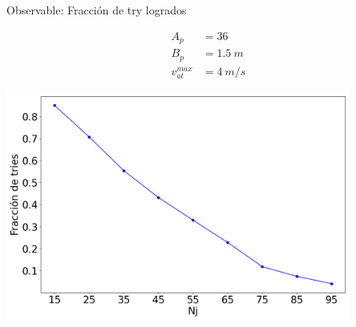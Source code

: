 \begin{frame}{Observable: Fracción de try logrados}
    \begin{center}
        \begin{minipage}{0.15\textwidth}
            \begin{equation*}
                \begin{aligned}
                    A_p &= 36 \\
                    B_p &= 1.5\ m \\
                    v_{at}^{max} &= 4\ m/s
                \end{aligned}
            \end{equation*}
        \end{minipage}
        \begin{minipage}{0.80\textwidth}
            \hfill\includegraphics[width=0.85\textwidth]{pic/05-resultados/r9}
        \end{minipage}
    \end{center}
    \footnotesize{}
\end{frame}

